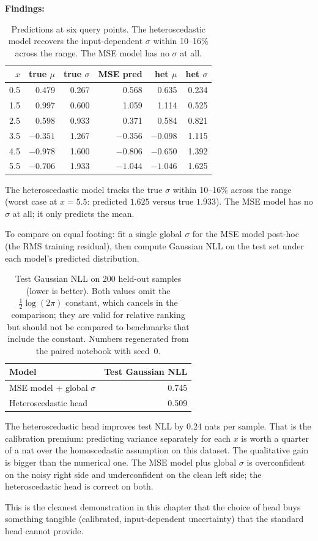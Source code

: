 \textbf{Findings:}

\begin{table}[ht]
\centering
\begin{tabular}{r r r r r r}
\toprule
$x$ & true $\mu$ & true $\sigma$ & MSE pred & het $\mu$ & het $\sigma$ \\
\midrule
0.5 & 0.479 & 0.267 & 0.568 & 0.635 & 0.234 \\
1.5 & 0.997 & 0.600 & 1.059 & 1.114 & 0.525 \\
2.5 & 0.598 & 0.933 & 0.371 & 0.584 & 0.821 \\
3.5 & $-0.351$ & 1.267 & $-0.356$ & $-0.098$ & 1.115 \\
4.5 & $-0.978$ & 1.600 & $-0.806$ & $-0.650$ & 1.392 \\
5.5 & $-0.706$ & 1.933 & $-1.044$ & $-1.046$ & 1.625 \\
\bottomrule
\end{tabular}
\caption{Predictions at six query points. The heteroscedastic model
  recovers the input-dependent $\sigma$ within 10--16\% across the
  range. The MSE model has no $\sigma$ at all.}
\end{table}

The heteroscedastic model tracks the true $\sigma$ within 10--16\%
across the range (worst case at $x = 5.5$: predicted $1.625$ versus
true $1.933$). The MSE model has no $\sigma$ at all; it only predicts
the mean.

To compare on equal footing: fit a single global $\sigma$ for the MSE
model post-hoc (the RMS training residual), then compute Gaussian NLL on
the test set under each model's predicted distribution.

\begin{table}[ht]
\centering
\begin{tabular}{lr}
\toprule
Model & Test Gaussian NLL \\
\midrule
MSE model + global $\sigma$ & 0.745 \\
Heteroscedastic head & 0.509 \\
\bottomrule
\end{tabular}
\caption{Test Gaussian NLL on 200 held-out samples (lower is better).
  Both values omit the $\tfrac{1}{2}\log(2\pi)$ constant, which cancels
  in the comparison; they are valid for relative ranking but should not
  be compared to benchmarks that include the constant.
  Numbers regenerated from the paired notebook with seed~0.}
\end{table}

The heteroscedastic head improves test NLL by 0.24 nats per sample.
That is the calibration premium: predicting variance separately for
each $x$ is worth a quarter of a nat over the homoscedastic assumption
on this dataset. The qualitative gain is bigger than the numerical one.
The MSE model plus global $\sigma$ is overconfident on the noisy right
side and underconfident on the clean left side; the heteroscedastic head
is correct on both.

This is the cleanest demonstration in this chapter that the choice of
head buys something tangible (calibrated, input-dependent uncertainty)
that the standard head cannot provide.
